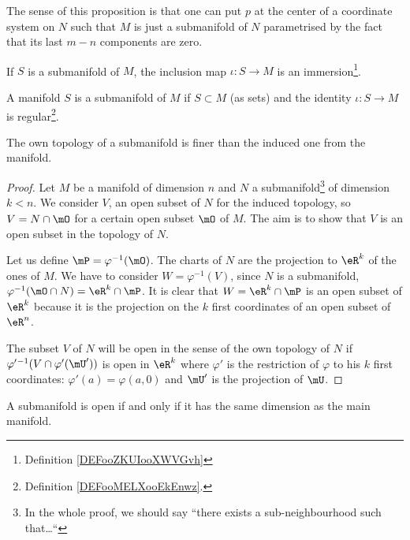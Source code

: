 The sense of this proposition is that one can put $p$ at the center of a coordinate system on $N$ such that $M$ is just a submanifold of $N$ parametrised by the fact that its last $m-n$ components are zero.

\begin{proposition}       \label{PROPooEWUCooTStAvb}
    If \( S\) is a submanifold of \( M\), the inclusion map \( \iota\colon S \to M\) is an immersion\footnote{Definition \ref{DEFooZKUIooXWVGvh}}.
\end{proposition}

\begin{proposition}     \label{PROPooZACHooCNgLSl}
    A manifold \( S\) is a submanifold of \( M\) if \( S\subset M\) (as sets) and the identity \( \iota\colon S\to M\) is regular\footnote{Definition \ref{DEFooMELXooEkEnwz}.}.
\end{proposition}

\begin{proposition}\label{prop:topo_sub_manif}
    The own topology of a submanifold is finer than the induced one from the manifold.
\end{proposition}

\begin{proof}
Let $M$ be a manifold of dimension $n$ and $N$ a submanifold\footnote{In the whole proof, we should say ``there exists a sub-neighbourhood such that\ldots``} of dimension $k<n$. We consider $V$, an open subset of $N$ for the induced topology, so $V=N\cap\mO$ for a certain open subset $\mO$ of $M$. The aim is to show that $V$ is an open subset in the topology of $N$.

Let us define $\mP=\varphi^{-1}(\mO)$.  The charts of $N$ are the projection to $\eR^k$ of the ones of $M$. We have to consider $W=\varphi^{-1}(V)$, since $N$ is a submanifold, $\varphi^{-1}(\mO\cap N)=\eR^k\cap\mP$. It is clear that $W=\eR^k\cap\mP$ is an open subset of $\eR^k$ because it is the projection on the $k$ first coordinates of an open subset of $\eR^n$.

The subset $V$ of $N$ will be open in the sense of the own topology of $N$ if $\varphi'{}^{-1}(V\cap\varphi'(\mU'))$ is open in $\eR^k$ where $\varphi'$ is the restriction of $\varphi$ to his $k$ first coordinates: $\varphi'(a)=\varphi(a,0)$ and $\mU'$ is the projection of $\mU$.
\end{proof}


\begin{proposition}\label{prop:subvar_ouvert}
    A submanifold is open if and only if it has the same dimension as the main manifold.
\end{proposition}

